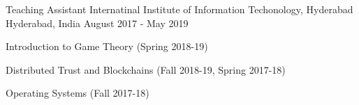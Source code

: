 \begin{cventries}
    \cventry
    {Teaching Assistant} %
    {Internatinal Institute of Information Techonology, Hyderabad} %
    {Hyderabad, India} %
    {August 2017 - May 2019} %
    {
    \begin{cvitems} %
        \item {Introduction to Game Theory (Spring 2018-19)}
        \item {Distributed Trust and Blockchains (Fall 2018-19, Spring 2017-18)}
        \item {Operating Systems (Fall 2017-18)}
    \end{cvitems}
    }

\end{cventries}
